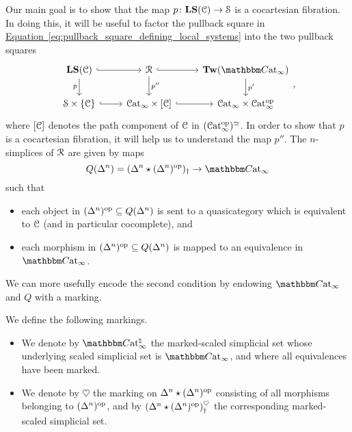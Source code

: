 \documentclass[main.tex]{subfiles}
\begin{document}
Our main goal is to show that the map $p\colon \mathbf{LS}(\mathcal{C}) \to \mathcal{S}$ is a cocartesian fibration. In doing this, it will be useful to factor the pullback square in \hyperref[eq:pullback_square_defining_local_systems]{Equation~\ref*{eq:pullback_square_defining_local_systems}} into the two pullback squares
\begin{equation*}
  \begin{tikzcd}
    \LS(\category{C})
    \arrow[r, hook]
    \arrow[d, swap, "p"]
    & \mathcal{R}
    \arrow[r, hook]
    \arrow[d, "p''"]
    & \Tw(\ICCat)
    \arrow[d, "p'"]
    \\
    \S \times \{\category{C}\}
    \arrow[r, hook]
    & \ICat \times [\category{C}]
    \arrow[r, hook]
    & \ICat \times \ICat\op
  \end{tikzcd},
\end{equation*}
where $[\mathcal{C}]$ denotes the path component of $\mathcal{C}$ in $( \mathcal{C}\mathrm{at}_{\infty}^{\mathrm{op}} )^{\simeq}$. In order to show that $p$ is a cocartesian fibration, it will help us to understand the map $p''$. The $n$-simplices of $\mathcal{R}$ are given by maps
\begin{equation*}
  Q(\Delta^{n}) = (\Delta^{n} \star (\Delta^{n})\op)_{\dagger} \to \ICCat
\end{equation*}
such that
\begin{itemize}
  \item each object in $(\Delta^{n})^{\mathrm{op}} \subseteq Q(\Delta^{n})$ is sent to a quasicategory which is equivalent to $\mathcal{C}$ (and in particular cocomplete), and

  \item each morphism in $(\Delta^{n})^{\mathrm{op}} \subseteq Q(\Delta^{n})$ is mapped to an equivalence in $\ICCat$.
\end{itemize}
We can more usefully encode the second condition by endowing $\ICCat$ and $Q$ with a marking.

\begin{definition}
  We define the following markings.
  \begin{itemize}
    \item We denote by $\ICCat^{\natural}$ the marked-scaled simplicial set whose underlying scaled simplicial set is $\ICCat$, and where all equivalences have been marked.

    \item We denote by $\heartsuit$ the marking on $\Delta^{n} \star (\Delta^{n})^{\mathrm{op}}$ consisting of all morphisms belonging to $(\Delta^{n})^{\mathrm{op}}$, and by $(\Delta^{n} \star (\Delta^{n})^{\mathrm{op}})^{\heartsuit}_{\dagger}$ the corresponding marked-scaled simplicial set.
  \end{itemize}
\end{definition}
\end{document}
